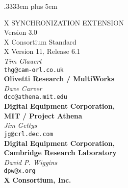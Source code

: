 
\newcommand{\cfunctionname}[1]{\mbox{\tt#1}}
\newcommand{\ctypename}[1]{\mbox{\tt#1}}
\newcommand{\cconst}[1]{\mbox{\tt#1}}
\newcommand{\cargname}[1]{\mbox{\it#1}}
\newcommand{\cstartfunction}[2]{\begin{sloppypar}\begin{samepage}\ctypename{#1}\\ \cfunctionname{#2}\ (}
\newcommand{\cargdecl}[2]{\penalty -1\ctypename{#1} \cargname{#2}}
\newcommand{\cendfunctiondecl}{){\hangafter=2 \hangindent=20pt \raggedright\par}}
\newcommand{\cendfuncdescription}{\end{samepage}\end{sloppypar}}

\newcommand{\cstartmacro}[2]{\begin{sloppypar}\begin{samepage}\ctypename{#1}\\ \cfunctionname{#2}\ (}
\newcommand{\cendmacrodecl}{)\par}
\newcommand{\cendmacrodescription}{\end{samepage}\end{sloppypar}}

\spaceskip .3333em plus 5em



\begin{center}

{\large X SYNCHRONIZATION EXTENSION}\\[10pt]
{\large Version 3.0}\\[15pt]
{\large X Consortium Standard}\\[15pt]
{\large X Version 11, Release 6.1}\\[15pt]
{\it Tim Glauert}\\[0pt]
{\tt thg@cam-orl.co.uk}\\[0pt]
{\bf Olivetti Research / MultiWorks}\\[5pt]
{\it Dave Carver}\\[0pt]
{\tt dcc@athena.mit.edu}\\[0pt]
{\bf Digital Equipment Corporation,}\\[0pt]
{\bf MIT / Project Athena}\\[5pt]
{\it Jim Gettys}\\[0pt]
{\tt jg@crl.dec.com}\\[0pt]
{\bf Digital Equipment Corporation,}\\[0pt]
{\bf Cambridge Research Laboratory}\\[5pt]
{\it David P. Wiggins}\\[0pt]
{\tt dpw@x.org}\\[0pt]
{\bf X Consortium, Inc.}\\[0pt]

\end {center}

